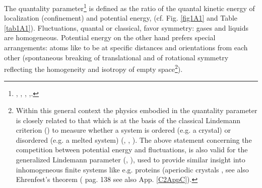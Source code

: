 The quantality parameter\footnote{\cite{Nosanow:76}, \cite{deBoer:57}, \cite{deBoer:48}, \cite{deBoer:48b},\cite{Mottelson:02}.} is defined as the ratio of the quantal kinetic energy of localization (confinement) and potential energy, (cf. Fig. \ref{fig1A1} and Table \ref{tab1A1}).
 Fluctuations, quantal or classical, favor symmetry: gases and liquids are homogeneous. Potential energy on the other hand prefers special arrangements: atoms like to be at specific distances and orientations from each other (spontaneous breaking of translational and of rotational symmetry reflecting the homogeneity and isotropy of empty space\footnote{Within this general context the physics embodied in the quantality parameter is closely related to that which is at the basis of the classical Lindemann criterion (\cite{Lindemann:10}) to measure whether a system is ordered (e.g. a crystal) or disordered (e.g. a melted system) (\cite{Bilgram:87}, \cite{Lowen:94}, \cite{Stillinger:90,Stillinger:95}). The above statement concerning the competition between potential energy and fluctuations,  is also valid for the generalized Lindemann parameter (\cite{Stillinger:90}, \cite{Zhou:99}), used to provide similar insight into inhomogeneous finite systems like e.g. proteins (aperiodic crystals \cite{Schrodinger:44}, see also Ehrenfest's theorem (\cite{Basdevant:05} pag. 138 see also App. \ref{C2AppC}).}).
 
